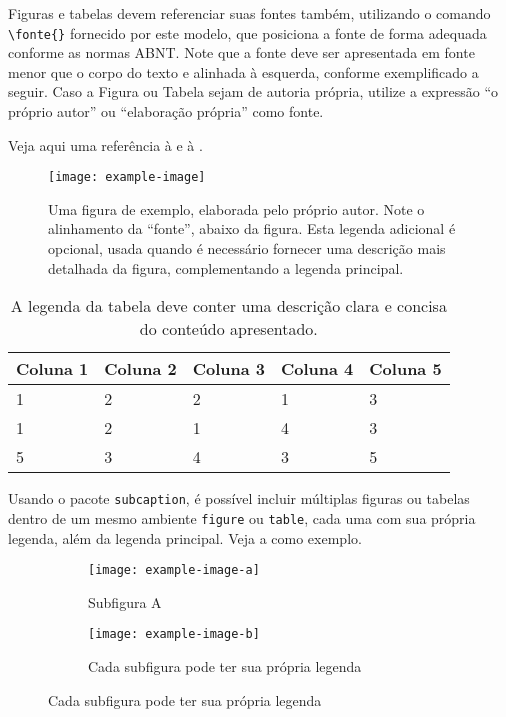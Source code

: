 Figuras e tabelas devem referenciar suas fontes também, utilizando o comando \verb|\fonte{}|
fornecido por este modelo, que posiciona a fonte de forma adequada conforme as normas ABNT.  Note
que a fonte deve ser apresentada em fonte menor que o corpo do texto e alinhada à esquerda, conforme
exemplificado a seguir. Caso a Figura ou Tabela sejam de autoria própria, utilize a expressão ``o
próprio autor'' ou ``elaboração própria'' como fonte.

Veja aqui uma referência à  e à .

\begin{figure}[!htbp]
    \centering
    \caption{Figura de exemplo}
    \label{fig:exemplo}
    \caption*{Uma figura de exemplo, elaborada pelo próprio autor. Note o alinhamento da ``fonte'', abaixo da figura. Esta legenda adicional é opcional, usada quando é necessário fornecer uma descrição mais detalhada da figura, complementando a legenda principal.}
    \texttt{[image: example-image]}
\end{figure}

\begin{table}[!htbp]
    \centering
    \caption{Tabela de exemplo}
    \caption*{A legenda da tabela deve conter uma descrição clara e concisa do conteúdo apresentado.}
    \label{tab:exemplo}
    \begin{tabular}{@{}lllll@{}}
        \toprule
        Coluna 1 & Coluna 2 & Coluna 3 & Coluna 4 & Coluna 5 \\ \midrule
        1        & 2        & 2        & 1        & 3        \\
        1        & 2        & 1        & 4        & 3        \\
        5        & 3        & 4        & 3        & 5        \\ \bottomrule
    \end{tabular}
\end{table}

Usando o pacote \texttt{subcaption}, é possível incluir múltiplas figuras ou tabelas dentro de um
mesmo ambiente \texttt{figure} ou \texttt{table}, cada uma com sua própria legenda, além da legenda
principal. Veja a  como exemplo.

\begin{figure}[!htbp]
    \centering
    \caption[Figura múltipla]{Exemplo de figura múltipla}
    \label{fig:exemplo-multiplo}
    \begin{subfigure}{0.45\textwidth}
        \centering
        \texttt{[image: example-image-a]}
        \caption{Subfigura A}
        \label{fig:subfig-a}
    \end{subfigure}
    \begin{subfigure}{0.45\textwidth}
        \centering
        \texttt{[image: example-image-b]}
        \caption{Subfigura B}
        \caption*{Cada subfigura pode ter sua própria legenda}
        \label{fig:subfig-b}
    \end{subfigure}
\end{figure}

